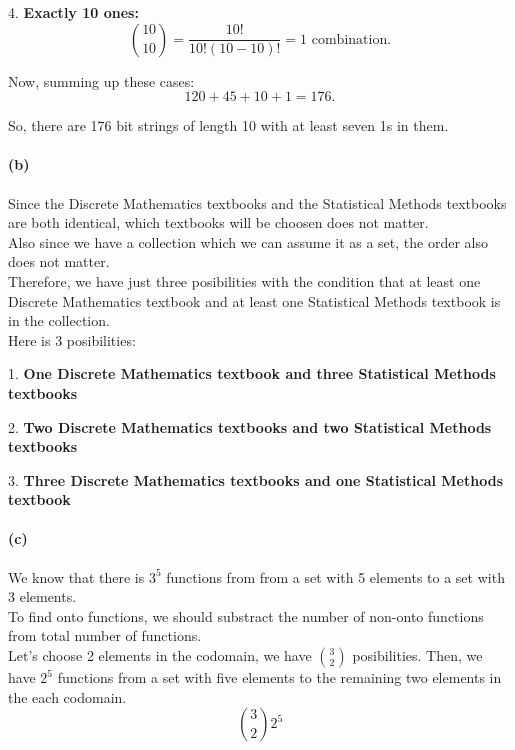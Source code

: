 \documentclass[12pt]{article}
\begin{document}
4. \textbf{Exactly 10 ones:}
   \[
   \binom{10}{10} = \frac{10!}{10!(10-10)!} = 1 \text{ combination.}
   \]

Now, summing up these cases:
\[
120 + 45 + 10 + 1 = 176.
\]

So, there are 176 bit strings of length 10 with at least seven 1s in them.


\paragraph{(b)}

   Since the Discrete Mathematics textbooks and the Statistical Methods textbooks are both identical, which textbooks will be choosen does not matter.\\

   Also since we have a collection which we can assume it as a set, the order also does not matter.\\

   Therefore, we have just three posibilities with the condition that at least one Discrete Mathematics textbook and at least one Statistical Methods textbook is in the collection.\\

   Here is 3 posibilities:

1. \textbf{One Discrete Mathematics textbook and three Statistical Methods textbooks}
   
2. \textbf{Two Discrete Mathematics textbooks and two Statistical Methods textbooks}

3. \textbf{Three Discrete Mathematics textbooks and one Statistical Methods textbook}

\paragraph{(c)}

We know that there is \(3^5\) functions from from a set with 5 elements to a set with 3 elements. \\

To find onto functions, we should substract the number of non-onto functions from total number of functions.\\

Let's choose 2 elements in the codomain, we have \(\binom{3}{2}\) posibilities. Then, we have \(2^5\) functions from a set with five elements to the remaining two elements in the each codomain. \\
\[
\binom{3}{2}2^5
\]
\end{document}
